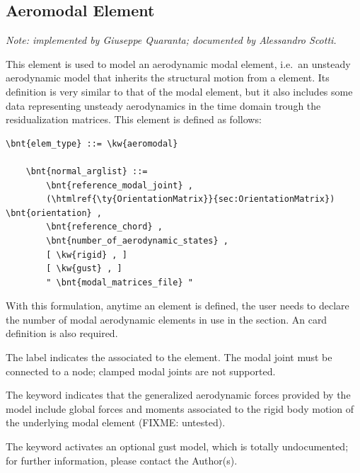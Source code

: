 \subsection{Aeromodal Element}
\emph{Note: implemented by Giuseppe Quaranta; documented by Alessandro Scotti.}

\noindent
This element is used to model an aerodynamic modal element,
i.e.\ an unsteady aerodynamic model that inherits the structural 
motion from a  element.
Its definition is very similar to that of the modal element, 
but it also includes some data representing unsteady aerodynamics 
in the time domain trough the residualization matrices.
This element is defined as follows:
\begin{Verbatim}[commandchars=\\\{\}]
    \bnt{elem_type} ::= \kw{aeromodal}

    \bnt{normal_arglist} ::= 
        \bnt{reference_modal_joint} ,
        (\htmlref{\ty{OrientationMatrix}}{sec:OrientationMatrix}) \bnt{orientation} ,
        \bnt{reference_chord} ,
        \bnt{number_of_aerodynamic_states} ,
        [ \kw{rigid} , ]
        [ \kw{gust} , ]
        " \bnt{modal_matrices_file} "
\end{Verbatim}
With this formulation, anytime an  element is defined, 
the user needs to declare the number of modal aerodynamic elements 
in use in the  section.
An 
card definition is also required.

The label  indicates
the 
associated to the  element.
The modal joint must be connected to a  node;
clamped modal joints are not supported.

The keyword  indicates that the generalized aerodynamic forces
provided by the model include global forces and moments associated 
to the rigid body motion of the underlying modal element (FIXME: untested).

The keyword  activates an optional gust model,
which is totally undocumented;
for further information, please contact the Author(s).

